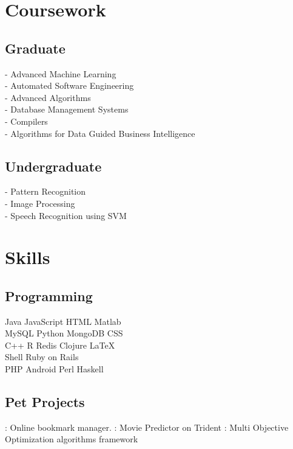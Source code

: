 \documentclass[]{bigfatnoob-resume}
\begin{document}
\begin{minipage}[t]{0.33\textwidth}

\section{Coursework}
\subsection{Graduate}
- Advanced Machine Learning \\
- Automated Software Engineering \\
- Advanced Algorithms \\
- Database Management Systems \\
- Compilers \\
- Algorithms for Data Guided Business Intelligence\\


\sectionsep

\subsection{Undergraduate}
- Pattern Recognition \\
- Image Processing \\
- Speech Recognition using SVM\\
\sectionsep


\section{Skills}
\subsection{Programming}
Java \textbullet{} JavaScript\textbullet{} HTML \textbullet{} Matlab \\
MySQL \textbullet{} Python \textbullet{} MongoDB \textbullet{} CSS \\ 
C++ \textbullet{} R \textbullet{} Redis \textbullet{} Clojure \textbullet{} \LaTeX\ \\ 
\textbullet{} Shell \textbullet{} Ruby on Rails\\
PHP \textbullet{} Android \textbullet{} Perl \textbullet{} Haskell
\sectionsep

\subsection{Pet Projects}
\href{http://region.io}{}: Online bookmark manager.
\href{https://github.com/NCSU-Advanced-Algos/octorater}{}: Movie Predictor on Trident
\href{https://github.com/bigfatnoob/optima}{}: Multi Objective Optimization algorithms framework

%
%

\end{minipage} 
\end{document}
